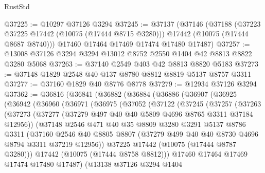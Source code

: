 \begin{lexlean}{RustStd}
\begin{coremodule}
@37225 := @10297 @37126 @3294
@37245 := @37137
    (@37146
      (@37188
        (@37223 @37225 @17442 (@10075 (@17444 @8715 @3280)))
        @17442
        (@10075 (@17444 @8687 @8740)))
      @17460
      @17464
      @17469
      @17474
      @17480
      @17487)
@37257 := @13008 @37126 @3294 @3294 @13012 @8752 @2550 @1404 @42 @8813 @8822 @3280 @5068
@37263 := @37140 @2549 @403 @42 @8813 @8820 @5183
@37273 := @37148 @1829 @2548 @40 @137 @8780 @8812 @8819 @5137 @8757 @3311
@37277 := @37160 @1829 @40 @8776 @8778
@37279 := @12934 @37126 @3294
@37362 := @36816
    (@36841
      (@36882
        (@36884
          (@36886
            (@36907
              (@36925
                (@36942
                  (@36960
                    (@36971
                      (@36975
                        (@37052
                          (@37122
                            (@37245
                              (@37257
                                (@37263
                                  (@37273
                                    (@37277
                                      (@37279 @497 @40 @40 @5809 @4696 @8765 @3311 @37184 @12956))
                                    (@37148
                                      @2546
                                      @471
                                      @40
                                      @35
                                      @8809
                                      @3280
                                      @3291
                                      @5137
                                      @8786
                                      @3311
                                      (@37160
                                        @2546
                                        @40
                                        @8805
                                        @8807
                                        (@37279 @499 @40 @40 @8730 @4696 @8794 @3311 @37219 @12956))
                                      @37225
                                      @17442
                                      (@10075 (@17444 @8787 @3280)))
                                    @17442
                                    (@10075 (@17444 @8758 @8812)))
                                  @17460
                                  @17464
                                  @17469
                                  @17474
                                  @17480
                                  @17487)
                                (@13138
                                  @37126
                                  @3294
                                  @1404

\end{coremodule}
\end{lexlean}

